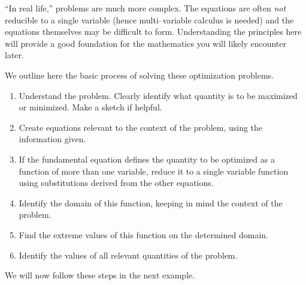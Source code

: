 ``In real life,'' problems are much more complex. The equations are often \textit{not} reducible to a single variable (hence multi--variable calculus is needed) and the equations themselves may be difficult to form. Understanding the principles here will provide a good foundation for the mathematics you will likely encounter later.

We outline here the basic process of solving these optimization problems.
\begin{enumerate}
		\item		Understand the problem. Clearly identify what quantity is to be maximized or minimized. Make a sketch if helpful.
		\item		Create equations relevant to the context of the problem, using the information given. 
		\item		If the fundamental equation defines the quantity to be optimized as a function of more than one variable, reduce it to a single variable function using substitutions derived from the other equations.
		\item		Identify the domain of this function, keeping in mind the context of the problem.
		\item		Find the extreme values of this function on the determined domain.
		\item		Identify the values of all relevant quantities of the problem.
		\end{enumerate}


We will now follow these steps in the next example.

